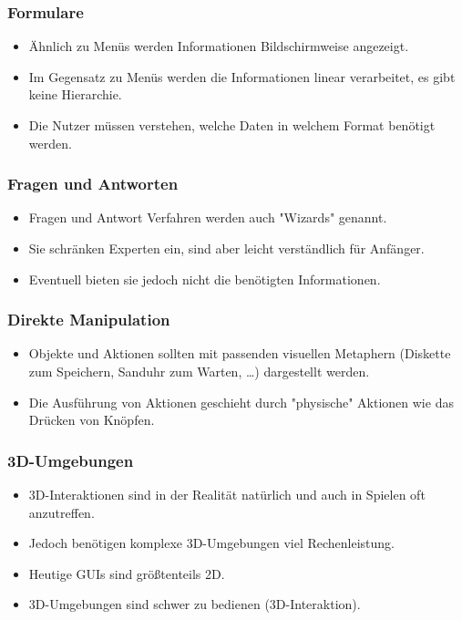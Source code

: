 				\subsubsection{Formulare}
					\begin{itemize}
						\item Ähnlich zu Menüs werden Informationen Bildschirmweise angezeigt.
						\item Im Gegensatz zu Menüs werden die Informationen linear verarbeitet, \dh es gibt keine Hierarchie.
						\item Die Nutzer müssen verstehen, welche Daten in welchem Format benötigt werden.
					\end{itemize}

				\subsubsection{Fragen und Antworten}
					\begin{itemize}
						\item Fragen und Antwort Verfahren werden auch "Wizards" genannt.
						\item Sie schränken Experten ein, sind aber leicht verständlich für Anfänger.
						\item Eventuell bieten sie jedoch nicht die benötigten Informationen.
					\end{itemize}

				\subsubsection{Direkte Manipulation}
					\begin{itemize}
						\item Objekte und Aktionen sollten mit passenden visuellen Metaphern (Diskette zum Speichern, Sanduhr zum Warten, \dots) dargestellt werden.
						\item Die Ausführung von Aktionen geschieht durch "physische" Aktionen wie das Drücken von Knöpfen.
					\end{itemize}

				\subsubsection{3D-Umgebungen}
					\begin{itemize}
						\item 3D-Interaktionen sind in der Realität natürlich und auch in Spielen oft anzutreffen.
						\item Jedoch benötigen komplexe 3D-Umgebungen viel Rechenleistung.
						\item Heutige GUIs sind größtenteils 2D.
						\item 3D-Umgebungen sind schwer zu bedienen (3D-Interaktion).
					\end{itemize}

